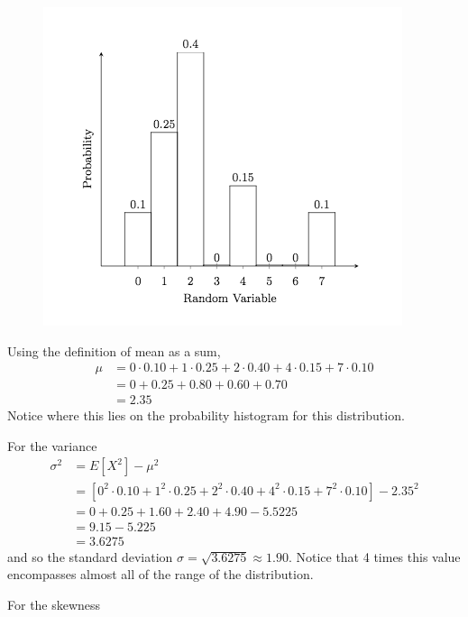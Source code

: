 \documentclass[10pt,]{book}
\numberwithin{equation}{section}
\begin{document}
 \begin{figure}\centering\includegraphics[width=1\linewidth]{images/DiscreteHistogramExample.png}
\end{figure}%
\par
\hypertarget{p-732}{}%
Using the definition of mean as a sum,%
\begin{align*}
\mu & = 0 \cdot 0.10 + 1 \cdot 0.25 + 2 \cdot 0.40 + 4 \cdot 0.15 + 7 \cdot 0.10\\
& = 0 + 0.25 + 0.80 + 0.60 + 0.70\\
& = 2.35
\end{align*}
Notice where this lies on the probability histogram for this distribution.%
\par
\hypertarget{p-733}{}%
For the variance%
\begin{align*}
\sigma^2 & = E[X^2] - \mu^2\\
& = \left [ 0^2 \cdot 0.10 + 1^2 \cdot 0.25 + 2^2 \cdot 0.40 + 4^2 \cdot 0.15 + 7^2 \cdot 0.10 \right ] - 2.35^2\\
& = 0 + 0.25 + 1.60 + 2.40 + 4.90 - 5.5225\\
& = 9.15 - 5.225\\
& = 3.6275 
\end{align*}
and so the standard deviation \(\sigma = \sqrt{3.6275} \approx 1.90\). Notice that 4 times this value encompasses almost all of the range of the distribution.%
\par
\hypertarget{p-734}{}%
For the skewness%
\end{document}
